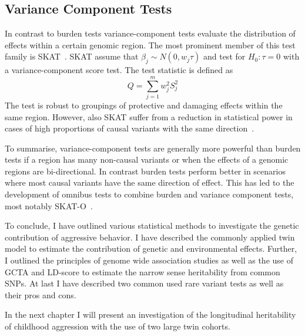 \subsection{Variance Component Tests}
\label{sub:variance_component_tests}
In contrast to burden tests variance-component tests evaluate the distribution of effects within a certain genomic region.
The most prominent member of this test family is SKAT~\cite{Wu2011}.
SKAT assume that $\beta_j\sim N(0,w_j\tau)$ and test for $H_0: \tau = 0$ with a variance-component score test.
The test statistic is defined as
\begin{equation}\label{eq:skat}
  Q = \sum^{m}_{j=1} w_{j}^2 S_{j}^2
\end{equation}
The test is robust to groupings of protective and damaging effects within the same region.
However, also SKAT suffer from a reduction in statistical power in cases of high proportions of causal variants with the same direction~\cite{Derkach2013a}.

To summarise, variance-component tests are generally more powerful than burden tests if a region has many non-causal variants or when the effects of a genomic regions are bi-directional.
In contrast burden tests perform better in scenarios where most causal variants have the same direction of effect.
This has led to the development of omnibus tests to combine burden and variance component tests, most notably SKAT-O~\cite{Lee2012}.
\bigskip

To conclude, I have outlined various statistical methods to investigate the genetic contribution of aggressive behavior.
I have described the commonly applied twin model to estimate the contribution of genetic and environmental effects.
Further, I outlined the principles of genome wide association studies as well as the use of GCTA and LD-score to estimate the narrow sense heritability from common SNPs.
At last I have described two common used rare variant tests as well as their pros and cons.

In the next chapter I will present an investigation of the longitudinal heritability of childhood aggression with the use of two large twin cohorts. 
